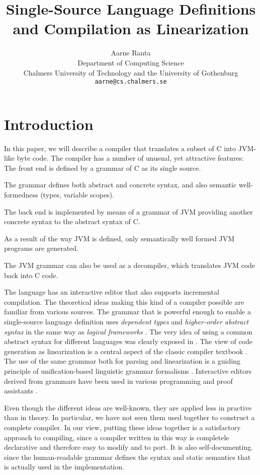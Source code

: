 \documentclass[12pt]{article}
\title{{\bf Single-Source Language Definitions and Compilation as Linearization}}
\author{Aarne Ranta \\
  Department of Computing Science \\
  Chalmers University of Technology and the University of Gothenburg\\
  {\tt aarne@cs.chalmers.se}}
\newcommand{\empha}[1]{{\em #1}}
\begin{document}
\maketitle


\section{Introduction}

In this paper, we will describe a compiler that translates a
subset of C into JVM-like byte code. The compiler has a number of
unusual, yet attractive features:
\bequ
The front end is defined by a grammar of C as its single source.

The grammar defines both abstract and concrete syntax, and also
semantic well-formedness (types, variable scopes).

The back end is implemented by means of a grammar of JVM providing
another concrete syntax to the abstract syntax of C.

As a result of the way JVM is defined, only semantically well formed
JVM programs are generated.

The JVM grammar can also be used as a decompiler, which translates
JVM code back into C code.

The language has an interactive editor that also supports incremental
compilation.
\enqu
The theoretical ideas making this kind of a compiler possible
are familiar from various sources.
The grammar that is
powerful enough to enable a single-source language definition
uses \empha{dependent types} and \empha{higher-order abstract syntax}
in the same way as \empha{logical frameworks} \cite{harper,ALF,twelf}.
The very idea of using a common abstract syntax for different 
languages was clearly exposed in \cite{landin}. The view of
code generation as linearization is a central aspect of
the classic compiler textbook \cite{aho-ullman}. The use
of the same grammar both for parsing and linearization
is a guiding principle of unification-based linguistic grammar 
formalisms \cite{pereira}. Interactive editors derived from
grammars have been used in various programming and proof
assistants \cite{teitelbaum-reps,metal,ALF}.

Even though the different ideas are well-known, they are
applied less in practive than in theory. In particular,
we have not seen them used together to construct a complete
compiler. In our view, putting these ideas together is
a satisfactory approach to compiling, since a compiler written
in this way is completele declarative and therefore easy to
modify and to port. It is also self-documenting. since the
human-readable grammar defines the syntax and static
semantics that is actually used in the implementation.
\end{document}

